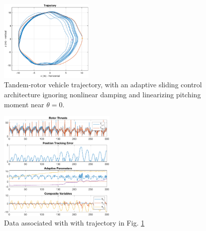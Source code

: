 \documentclass[letterpaper, 10 pt, conference]{ieeeconf}\usepackage[margin=1in]{geometry}
\begin{document}
\begin{figure}[h!]
	\centering
	\includegraphics[width=0.4\textwidth]{circle_linear_traj}
	\caption{Tandem-rotor vehicle trajectory, with an adaptive sliding control architecture ignoring nonlinear damping and linearizing pitching moment near $\theta = 0$.}
	\label{circle_traj_3}
\end{figure}

\begin{figure}[h!]
	\centering
	\includegraphics[width=0.5\textwidth]{circle_linear}
	\caption{Data associated with with trajectory in Fig. \ref{circle_traj_3}}
	\label{circle_data_3}
\end{figure}
\end{document}
